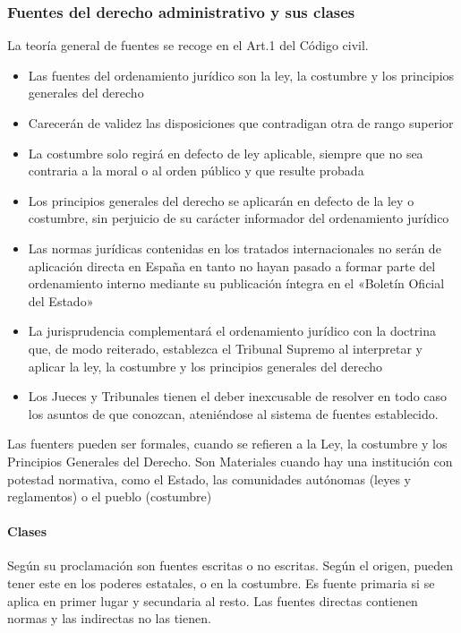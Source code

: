     \subsubsection{Fuentes del derecho administrativo y sus clases}
        La teoría general de fuentes se recoge en el Art.1 del Código civil.
        \begin{itemize}
            \item Las fuentes del ordenamiento jurídico son la ley, la costumbre y los principios generales del derecho
            \item Carecerán de validez las disposiciones que contradigan otra de rango superior
            \item La costumbre solo regirá en defecto de ley aplicable, siempre que no sea contraria a la moral o al orden público y que resulte probada
            \item Los principios generales del derecho se aplicarán en defecto de la ley o costumbre, sin perjuicio de su carácter informador del ordenamiento jurídico
            \item Las normas jurídicas contenidas en los tratados internacionales no serán de aplicación directa en España en tanto no hayan pasado a formar parte del ordenamiento interno mediante su publicación íntegra en el «Boletín Oficial del Estado»
            \item La jurisprudencia complementará el ordenamiento jurídico con la doctrina que, de modo reiterado, establezca el Tribunal Supremo al interpretar y aplicar la ley, la costumbre y los principios generales del derecho
            \item Los Jueces y Tribunales tienen el deber inexcusable de resolver en todo caso los asuntos de que conozcan, ateniéndose al sistema de fuentes establecido.
        \end{itemize}
        Las fuenters pueden ser formales, cuando se refieren a la Ley, la costumbre y los Principios Generales del Derecho. Son Materiales cuando hay una institución con potestad normativa, como el Estado, las comunidades autónomas (leyes y reglamentos) o el pueblo (costumbre)

        \paragraph{Clases}
            Según su proclamación son fuentes escritas o no escritas. Según el origen, pueden tener este en los poderes estatales, o en la costumbre. Es fuente primaria si se aplica en primer lugar y secundaria al resto. Las fuentes directas contienen normas y las indirectas no las tienen.

